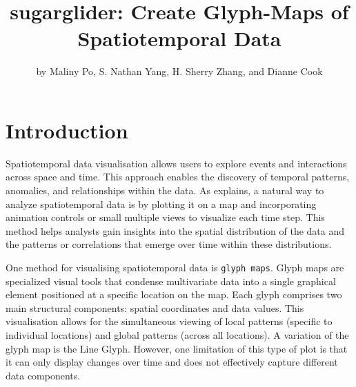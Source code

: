 \title{sugarglider: Create Glyph-Maps of Spatiotemporal Data}


\author{by Maliny Po, S. Nathan Yang, H. Sherry Zhang, and Dianne Cook}

\maketitle


\section{Introduction}\label{introduction}

Spatiotemporal data visualisation allows users to explore events and interactions across space and time. This approach enables the discovery of temporal patterns, anomalies, and relationships within the data. As \citet{kim2017data} explains, a natural way to analyze spatiotemporal data is by plotting it on a map and incorporating animation controls or small multiple views to visualize each time step. This method helps analysts gain insights into the spatial distribution of the data and the patterns or correlations that emerge over time within these distributions.

One method for visualising spatiotemporal data is \texttt{glyph\ maps}. Glyph maps are specialized visual tools that condense multivariate data into a single graphical element positioned at a specific location on the map. Each glyph comprises two main structural components: spatial coordinates and data values. This visualisation allows for the simultaneous viewing of local patterns (specific to individual locations) and global patterns (across all locations). A variation of the glyph map is the Line Glyph. However, one limitation of this type of plot is that it can only display changes over time and does not effectively capture different data components.

